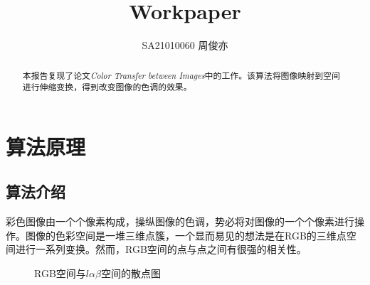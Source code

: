 \documentclass[12pt]{article}
\title{\LARGE\textbf{Workpaper}}
\author{SA21010060 周俊亦}
\date{}
\begin{document}
	\maketitle
	\renewcommand{\abstractname}{Abstract}
	\begin{abstract}
		本报告复现了论文\textsl{Color Transfer between Images}中的工作。该算法将图像映射到空间进行伸缩变换，得到改变图像的色调的效果。
	\end{abstract}
	
	\section{算法原理}
		\subsection{算法介绍}
		彩色图像由一个个像素构成，操纵图像的色调，势必将对图像的一个个像素进行操作。图像的色彩空间是一堆三维点簇，一个显而易见的想法是在RGB的三维点空间进行一系列变换。然而，RGB空间的点与点之间有很强的相关性。
		
		\begin{figure}[htbp]
			\centering
			\centering
			\caption{RGB空间与$ l\alpha \beta $空间的散点图}
		\end{figure}
		
\end{document}
